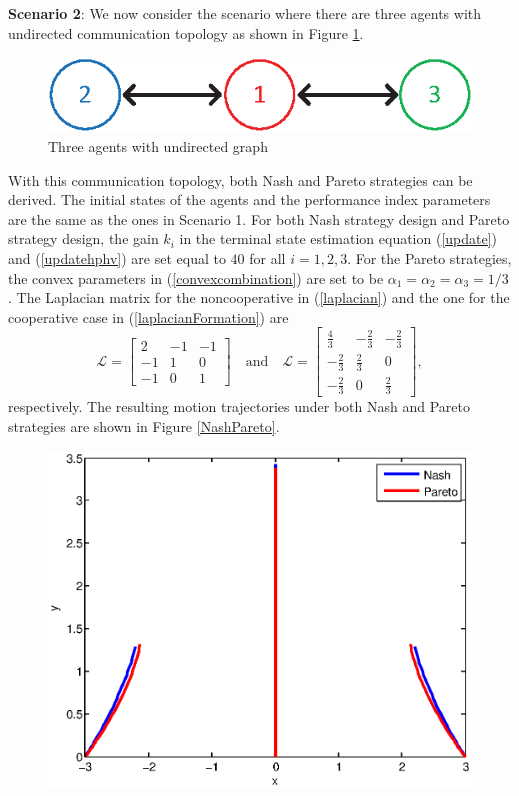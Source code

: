 \documentclass[12pt,draftcls,onecolumn]{IEEEtran}  %
\begin{document}
{\textbf{Scenario 2}: We now consider the scenario where there are three agents with undirected communication topology as shown in Figure \ref{Formation3undirected}.
\begin{figure}[h]
      \centering
      \includegraphics[scale=0.8]{Formation3undirected.eps}
      \caption{Three agents with undirected graph}\label{Formation3undirected}
\end{figure}
With this communication topology, both Nash and Pareto strategies can be derived. The initial states of the agents and the performance index parameters are the same as the ones in Scenario 1. For both Nash strategy design and Pareto strategy design, the gain $k_i$ in the terminal state estimation equation (\ref{update}) and (\ref{updatehphv}) are set equal to $40$ for all $i=1,2,3$. For the Pareto strategies, the convex parameters in (\ref{convexcombination}) are set to be $\alpha_1=\alpha_2=\alpha_3=1/3$. The Laplacian matrix for the noncooperative in (\ref{laplacian}) and the one for the cooperative case in (\ref{laplacianFormation}) are
\[\mathcal{L}=\begin{bmatrix}
2&-1&-1\\
-1&1&0\\
-1&0&1
\end{bmatrix}\quad\mbox{and}\quad \mathcal{L}=\begin{bmatrix}
\frac{4}{3}&-\frac{2}{3}&-\frac{2}{3}\\
-\frac{2}{3}&\frac{2}{3}&0\\
-\frac{2}{3}&0&\frac{2}{3}
\end{bmatrix},\]
respectively. The resulting motion trajectories under both Nash and Pareto strategies are shown in Figure \ref{NashPareto}.
\begin{figure}[h!]
      \centering
      \includegraphics[scale=0.5]{NashPareto.eps}

\end{figure}}
\end{document}
